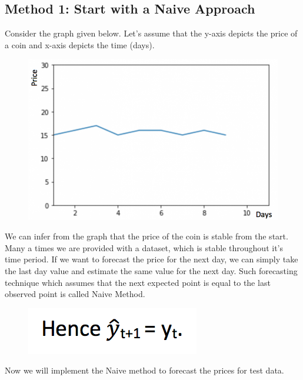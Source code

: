 \documentclass[11pt]{article}
\makeatletter
\def\maxwidth{\ifdim\Gin@nat@width>\linewidth\linewidth
    \else\Gin@nat@width\fi}
\let\Oldincludegraphics\includegraphics
\renewcommand{\includegraphics}[1]{\Oldincludegraphics[width=.8\maxwidth]{#1}}
\makeatother
\begin{document}
    \subsection{Method 1: Start with a Naive
Approach}\label{method-1-start-with-a-naive-approach}

Consider the graph given below. Let's assume that the y-axis depicts the
price of a coin and x-axis depicts the time (days).

\begin{figure}
\centering
\includegraphics{image.png}
\caption{}
\end{figure}

We can infer from the graph that the price of the coin is stable from
the start. Many a times we are provided with a dataset, which is stable
throughout it's time period. If we want to forecast the price for the
next day, we can simply take the last day value and estimate the same
value for the next day. Such forecasting technique which assumes that
the next expected point is equal to the last observed point is called
Naive Method.

\begin{figure}
\centering
\includegraphics{image1.png}
\caption{}
\end{figure}

Now we will implement the Naive method to forecast the prices for test
data.
\end{document}
